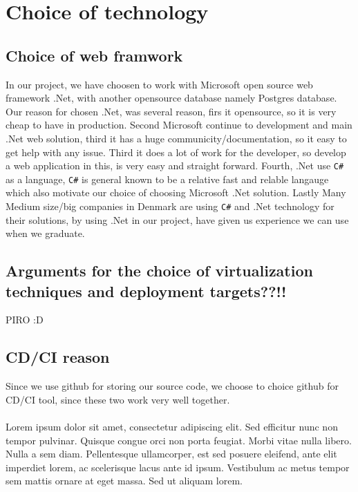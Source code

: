 
\section{Choice of technology}

\subsection{Choice of web framwork}
In our project, we have choosen to work with Microsoft open source web framework .Net, with another opensource database namely Postgres database. Our reason for chosen .Net, was several reason, firs it opensource, so it is very cheap to have in production. Second Microsoft continue to development and main .Net web solution, third it has a huge communicity/documentation, so it easy to get help with any issue. Third it does a lot of work for the developer, so develop a web application in this, is very easy and straight forward. Fourth, .Net use \texttt{C\#} as a language, \texttt{C\#} is general known to be a relative fast and relable langauge which also motivate our choice of choosing Microsoft .Net solution. Lastly Many Medium size/big companies in Denmark are using \texttt{C\#} and .Net technology for their solutions, by using .Net in our project, have given us experience we can use when we graduate. 


\subsection{Arguments for the choice of virtualization techniques and deployment targets??!!}
PIRO :D 

\subsection{CD/CI reason}
Since we use github for storing our source code, we choose to choice github for CD/CI tool, since these two work very well together. 



\paragraph{}  Lorem ipsum dolor sit amet, consectetur adipiscing elit. Sed efficitur nunc non tempor pulvinar. Quisque congue orci non porta feugiat. Morbi vitae nulla libero. Nulla a sem diam. Pellentesque ullamcorper, est sed posuere eleifend, ante elit imperdiet lorem, ac scelerisque lacus ante id ipsum. Vestibulum ac metus tempor sem mattis ornare at eget massa. Sed ut aliquam lorem. 